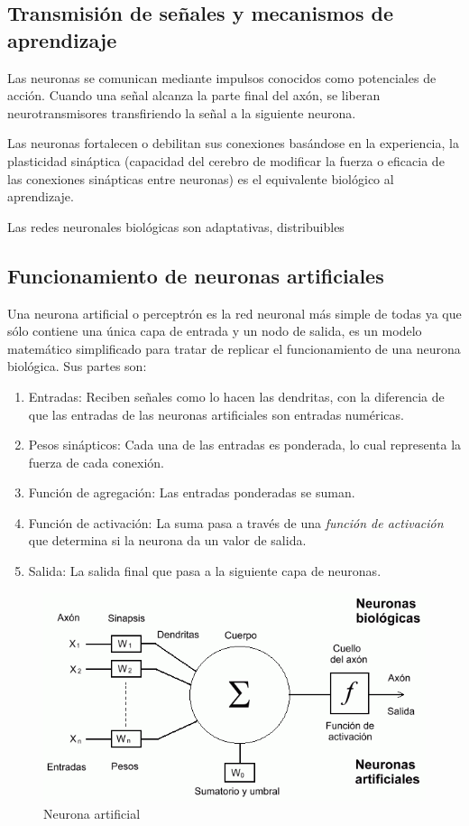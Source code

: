 \subsection{Transmisión de señales y mecanismos de aprendizaje}

Las neuronas se comunican mediante impulsos conocidos como potenciales de acción. Cuando una señal alcanza la parte final del axón, se liberan neurotransmisores transfiriendo la señal a la siguiente neurona. 

Las neuronas fortalecen o debilitan sus conexiones basándose en la experiencia, la plasticidad sináptica (capacidad del cerebro de modificar la fuerza o eficacia de las conexiones sinápticas entre neuronas) es el equivalente biológico al aprendizaje. 

Las redes neuronales biológicas son adaptativas, distribuibles 

\subsection{Funcionamiento de neuronas artificiales}

Una neurona artificial o perceptrón es la red neuronal más simple de todas ya que sólo contiene una única capa de entrada y un nodo de salida, es un modelo matemático simplificado para tratar de replicar el funcionamiento de una neurona biológica. Sus partes son: 

\begin{enumerate}
\item Entradas: Reciben señales como lo hacen las dendritas, con la diferencia de que las entradas de las neuronas artificiales son entradas numéricas.
\item Pesos sinápticos: Cada una de las entradas es ponderada, lo cual representa la fuerza de cada conexión.
\item Función de agregación: Las entradas ponderadas se suman. 
\item Función de activación: La suma pasa a través de una \textit{función de activación} que determina si la neurona da un valor de salida.
\item Salida: La salida final que pasa a la siguiente capa de neuronas. 
\end{enumerate}

\begin{figure}[h!] %
		\centering	
		\includegraphics[scale=0.7]{artneuron.png}
		\caption{Neurona artificial}
\end{figure}

